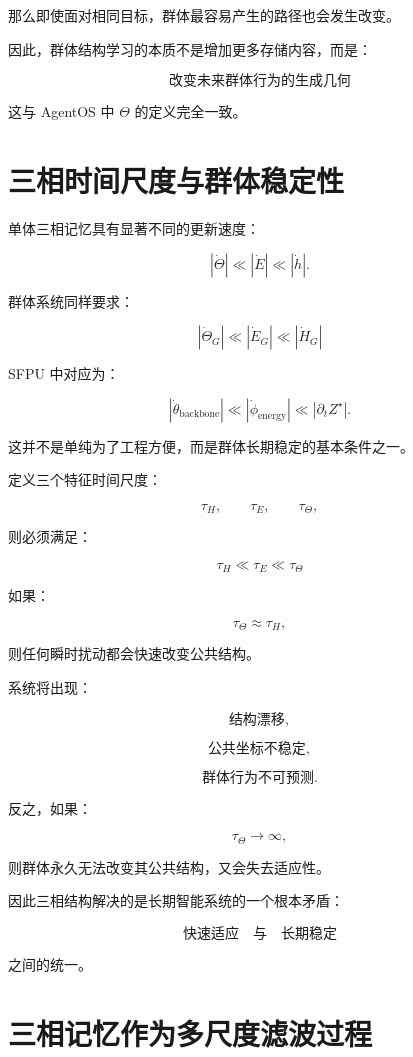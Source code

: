 那么即使面对相同目标，群体最容易产生的路径也会发生改变。

因此，群体结构学习的本质不是增加更多存储内容，而是：

\[
\boxed{
\text{改变未来群体行为的生成几何}
}
\]

这与 AgentOS 中 $\Theta$ 的定义完全一致。


\section{三相时间尺度与群体稳定性}

单体三相记忆具有显著不同的更新速度：

\[
|\dot{\Theta}|
\ll
|\dot E|
\ll
|\dot h|.
\]

群体系统同样要求：

\[
\boxed{
|\dot{\Theta}_G|
\ll
|\dot E_G|
\ll
|\dot H_G|
}
\]

SFPU 中对应为：

\[
|\dot{\theta}_{\mathrm{backbone}}|
\ll
|\dot{\phi}_{\mathrm{energy}}|
\ll
|\partial_t Z^\star|.
\]

这并不是单纯为了工程方便，而是群体长期稳定的基本条件之一。

定义三个特征时间尺度：

\[
\tau_H,
\qquad
\tau_E,
\qquad
\tau_\Theta,
\]

则必须满足：

\[
\boxed{
\tau_H
\ll
\tau_E
\ll
\tau_\Theta
}
\]

如果：

\[
\tau_\Theta
\approx
\tau_H,
\]

则任何瞬时扰动都会快速改变公共结构。

系统将出现：

\[
\text{结构漂移},
\]

\[
\text{公共坐标不稳定},
\]

\[
\text{群体行为不可预测}.
\]

反之，如果：

\[
\tau_\Theta
\rightarrow
\infty,
\]

则群体永久无法改变其公共结构，又会失去适应性。

因此三相结构解决的是长期智能系统的一个根本矛盾：

\[
\boxed{
\text{快速适应}
\quad\text{与}\quad
\text{长期稳定}
}
\]

之间的统一。


\section{三相记忆作为多尺度滤波过程}

